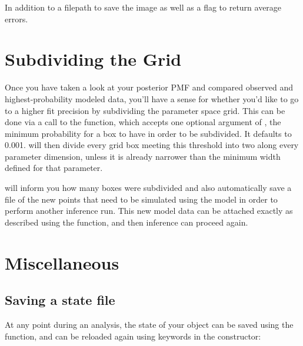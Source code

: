 \documentclass[letterpaper,10pt,english]{sphinxmanual}
\begin{document}
In addition to a filepath to save the image as well as a flag to return average errors.


\section{Subdividing the Grid}
\label{\detokenize{manual:subdividing-the-grid}}
Once you have taken a look at your posterior PMF and compared observed and highest-probability modeled data, you’ll have a sense for whether you’d like to go to a higher fit precision by subdividing the parameter space grid. This can be done via a call to the  function, which accepts one optional argument of , the minimum probability for a box to have in order to be subdivided. It defaults to 0.001.  will then divide every grid box meeting this threshold  into two along every parameter dimension, unless it is already narrower than the minimum width defined for that parameter.

 will inform you how many boxes were subdivided and also automatically save a file of the new points that need to be simulated using the model in order to perform another inference run. This new model data can be attached exactly as described {\hyperref[\detokenize{manual:attach-obs}]{}} using the  function, and then inference can proceed again.


\section{Miscellaneous}
\label{\detokenize{manual:miscellaneous}}

\subsection{Saving a state file}
\label{\detokenize{manual:saving-a-state-file}}
At any point during an analysis, the state of your  object can be saved using the  function, and can be reloaded again using keywords in the  constructor:

%
\begin{sphinxVerbatim}[commandchars=\\\{\}]
   
\end{sphinxVerbatim}
\end{document}
